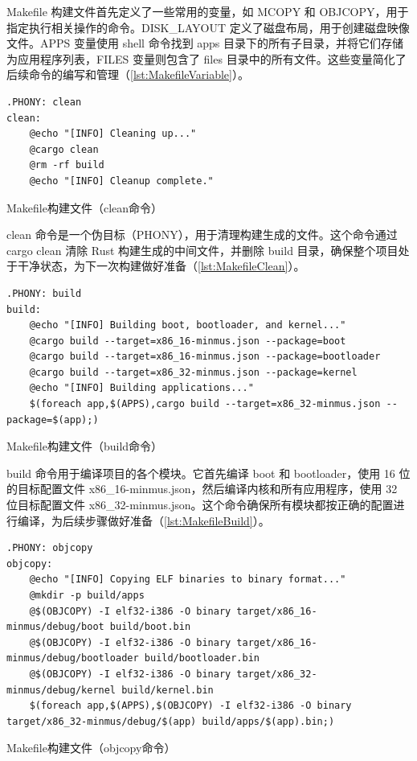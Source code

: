 Makefile 构建文件首先定义了一些常用的变量，如 MCOPY 和 OBJCOPY，用于指定执行相关操作的命令。DISK\_LAYOUT 定义了磁盘布局，用于创建磁盘映像文件。APPS 变量使用 shell 命令找到 apps 目录下的所有子目录，并将它们存储为应用程序列表，FILES 变量则包含了 files 目录中的所有文件。这些变量简化了后续命令的编写和管理（\cref{lst:MakefileVariable}）。

\begin{listing}[htbp]
    \begin{verbatim}
.PHONY: clean
clean:
    @echo "[INFO] Cleaning up..."
    @cargo clean
    @rm -rf build
    @echo "[INFO] Cleanup complete."
    \end{verbatim}
    \caption{Makefile构建文件（clean命令）}\label{lst:MakefileClean}
\end{listing}

clean 命令是一个伪目标（PHONY），用于清理构建生成的文件。这个命令通过 cargo clean 清除 Rust 构建生成的中间文件，并删除 build 目录，确保整个项目处于干净状态，为下一次构建做好准备（\cref{lst:MakefileClean}）。

\begin{listing}[htbp]
    \begin{verbatim}
.PHONY: build
build:
    @echo "[INFO] Building boot, bootloader, and kernel..."
    @cargo build --target=x86_16-minmus.json --package=boot
    @cargo build --target=x86_16-minmus.json --package=bootloader
    @cargo build --target=x86_32-minmus.json --package=kernel
    @echo "[INFO] Building applications..."
    $(foreach app,$(APPS),cargo build --target=x86_32-minmus.json --package=$(app);)
    \end{verbatim}
    \caption{Makefile构建文件（build命令）}\label{lst:MakefileBuild}
\end{listing}

build 命令用于编译项目的各个模块。它首先编译 boot 和 bootloader，使用 16 位的目标配置文件 x86\_16-minmus.json，然后编译内核和所有应用程序，使用 32 位目标配置文件 x86\_32-minmus.json。这个命令确保所有模块都按正确的配置进行编译，为后续步骤做好准备（\cref{lst:MakefileBuild}）。

\begin{listing}[htbp]
    \begin{verbatim}
.PHONY: objcopy
objcopy:
    @echo "[INFO] Copying ELF binaries to binary format..."
    @mkdir -p build/apps
    @$(OBJCOPY) -I elf32-i386 -O binary target/x86_16-minmus/debug/boot build/boot.bin
    @$(OBJCOPY) -I elf32-i386 -O binary target/x86_16-minmus/debug/bootloader build/bootloader.bin
    @$(OBJCOPY) -I elf32-i386 -O binary target/x86_32-minmus/debug/kernel build/kernel.bin
    $(foreach app,$(APPS),$(OBJCOPY) -I elf32-i386 -O binary target/x86_32-minmus/debug/$(app) build/apps/$(app).bin;)   
    \end{verbatim}
    \caption{Makefile构建文件（objcopy命令）}\label{lst:MakefileObjcopy}
\end{listing}

